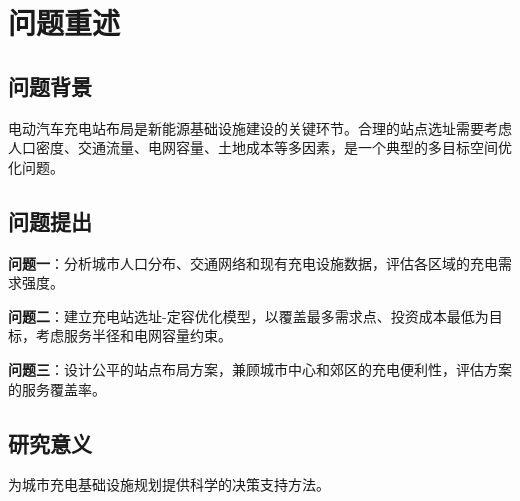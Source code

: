 \newpage
\section{问题重述}

\subsection{问题背景}
电动汽车充电站布局是新能源基础设施建设的关键环节。合理的站点选址需要考虑人口密度、交通流量、电网容量、土地成本等多因素，是一个典型的多目标空间优化问题。

\subsection{问题提出}
\textbf{问题一}：分析城市人口分布、交通网络和现有充电设施数据，评估各区域的充电需求强度。

\textbf{问题二}：建立充电站选址-定容优化模型，以覆盖最多需求点、投资成本最低为目标，考虑服务半径和电网容量约束。

\textbf{问题三}：设计公平的站点布局方案，兼顾城市中心和郊区的充电便利性，评估方案的服务覆盖率。

\subsection{研究意义}
为城市充电基础设施规划提供科学的决策支持方法。
